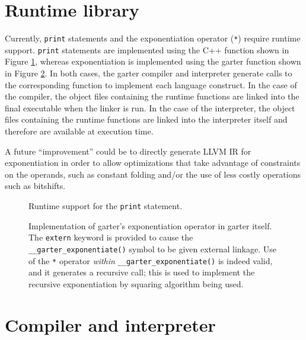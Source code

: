 \documentclass[11pt]{article}
\begin{document}
\section{Runtime library}

\label{sec:runtime}

Currently, {\tt print} statements and the exponentiation operator ({\tt **}) require
runtime support.  {\tt print} statements are implemented using the C++ function
shown in Figure \ref{fig:print}, whereas exponentiation is implemented using the
garter function shown in Figure \ref{fig:exponentiate}.  In both cases, the
garter compiler and interpreter generate calls to the corresponding function to
implement each language construct.  In the case of the compiler, the object
files containing the runtime functions are linked into the final executable when
the linker is run.  In the case of the interpreter, the object files containing
the runtime functions are linked into the interpreter itself and therefore are
available at execution time.

A future ``improvement'' could be to directly generate LLVM IR for
exponentiation in order to allow optimizations that take advantage of
constraints on the operands, such as constant folding and/or the use of less
costly operations such as bitshifts.

\begin{figure}
    \lstset{language=C++}
    \lstset{numbers=left}
    
    \caption{Runtime support for the {\tt print} statement.}
    \label{fig:print}
\end{figure}

\begin{figure}
    \lstset{numbers=left}
    
    \caption{Implementation of garter's exponentiation operator in garter itself.
        The {\tt extern} keyword is provided to cause the {\tt
        \_\_garter\_exponentiate()} symbol to be given external linkage.  Use of
        the {\tt **} operator {\em within} {\tt \_\_garter\_exponentiate()} is
        indeed valid, and it generates a recursive call; this is used to
        implement the recursive exponentiation by squaring algorithm being used.
    }
    \label{fig:exponentiate}
\end{figure}

\section{Compiler and interpreter}
\end{document}
